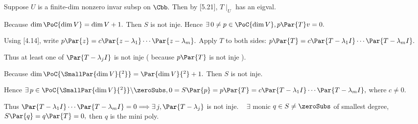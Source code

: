 Suppose $U$ is a finite-dim nonzero invar subsp on $\Cbb.$ Then by [5.21], $T\mid_U$ has an eigval.\PfEnd
\SepLine

\par\quad
Because $\dim\PoC{\dim V}=\dim V+1.$ Then $S$ is not inje. Hence $\exists\,0\neq p\in\PoC{\dim V},p\Par{T}v=0.$\par\quad
Using [4.14], write $p\Par{z}=c\Par{z-\lambda_1}\cdots\Par{z-\lambda_m}.$ Apply $T$ to both sides: $p\Par{T}=c\Par{T-\lambda_1 I}\cdots\Par{T-\lambda_m I}.$\par\quad
Thus at least one of $\Par{T-\lambda_j I}$ is not inje ( because $p\Par{T}$ is not inje ).\PfEnd
\SepLine


\par\quad
Because $\dim\PoC{\SmallPar{\dim V}{^2}}=\Par{\dim V}{^2}+1.$ Then $S$ is not inje.\par\quad
Hence $\exists\,p\in\PoC{\SmallPar{\dim V}{^2}}\backslash\zeroSubs,0=S\Par{p}=p\Par{T}=c\Par{T-\lambda_1 I}\cdots\Par{T-\lambda_m I},$ where $c\neq 0.$\par\quad
Thus $\Par{T-\lambda_1 I}\cdots\Par{T-\lambda_m I}=0\Longrightarrow\exists\,j,\Par{T-\lambda_j}$ is not inje.\PfEnd
\Comment\,\,\, $\exists$ monic $q\in\null S\neq \zeroSubs$ of smallest degree, $S\Par{q}=q\Par{T}=0,$ then $q$ is the {\tgsl mini poly.}\par
\SepLine

